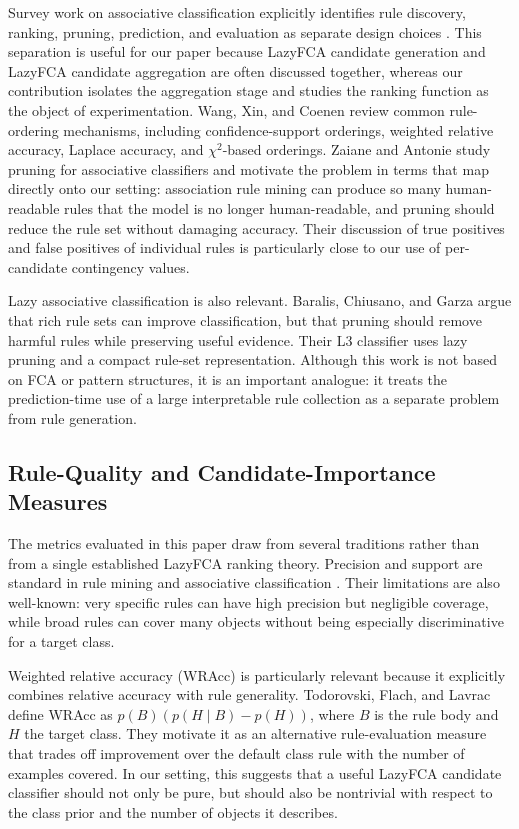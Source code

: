 \documentclass[11pt]{article}
\begin{document}
Survey work on associative classification explicitly identifies rule
discovery, ranking, pruning, prediction, and evaluation as separate design
choices \cite{thabtah2007review}. This separation is useful for our paper
because LazyFCA candidate generation and LazyFCA candidate aggregation are
often discussed together, whereas our contribution isolates the aggregation
stage and studies the ranking function as the object of experimentation.
Wang, Xin, and Coenen \cite{wang2007novel} review common rule-ordering
mechanisms, including confidence-support orderings, weighted relative
accuracy, Laplace accuracy, and $\chi^2$-based orderings. Zaiane and Antonie
\cite{zaiane2005pruning} study pruning for associative classifiers and
motivate the problem in terms that map directly onto our setting: association
rule mining can produce so many human-readable rules that the model is no
longer human-readable, and pruning should reduce the rule set without
damaging accuracy. Their discussion of true positives and false positives of
individual rules is particularly close to our use of per-candidate
contingency values.

Lazy associative classification is also relevant. Baralis, Chiusano, and
Garza \cite{baralis2008lazy} argue that rich rule sets can improve
classification, but that pruning should remove harmful rules while preserving
useful evidence. Their L3 classifier uses lazy pruning and a compact rule-set
representation. Although this work is not based on FCA or pattern structures,
it is an important analogue: it treats the prediction-time use of a large
interpretable rule collection as a separate problem from rule generation.

\subsection{Rule-Quality and Candidate-Importance Measures}

The metrics evaluated in this paper draw from several traditions rather than
from a single established LazyFCA ranking theory. Precision and support are
standard in rule mining and associative classification
\cite{liu1998integrating,thabtah2007review}. Their limitations are also
well-known: very specific rules can have high precision but negligible
coverage, while broad rules can cover many objects without being especially
discriminative for a target class.

Weighted relative accuracy (WRAcc) is particularly relevant because it
explicitly combines relative accuracy with rule generality. Todorovski,
Flach, and Lavrac \cite{todorovski2000predictive} define WRAcc as
$p(B)(p(H \mid B)-p(H))$, where $B$ is the rule body and $H$ the target class.
They motivate it as an alternative rule-evaluation measure that trades off
improvement over the default class rule with the number of examples covered.
In our setting, this suggests that a useful LazyFCA candidate classifier should
not only be pure, but should also be nontrivial with respect to the class
prior and the number of objects it describes.
\end{document}
